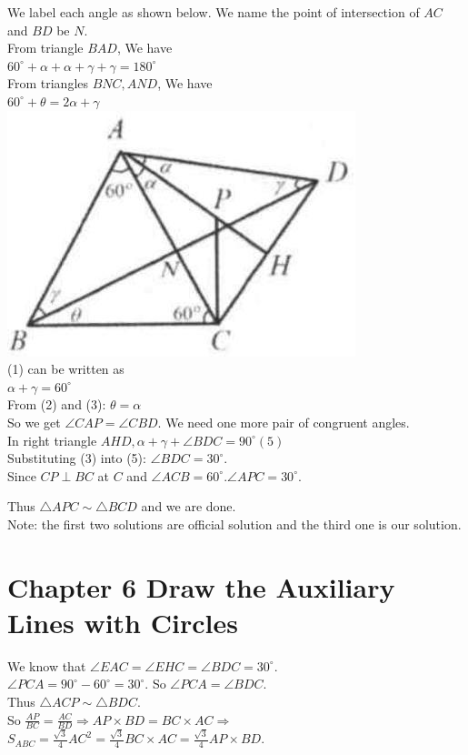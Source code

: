 \documentclass[10pt]{article}
\begin{document}
We label each angle as shown below. We name the point of intersection of \(A C\) and \(B D\) be \(N\).\\
From triangle \(B A D\), We have\\
\(60^{\circ}+\alpha+\alpha+\gamma+\gamma=180^{\circ}\)\\
From triangles \(B N C, A N D\), We have\\
\(60^{\circ}+\theta=2 \alpha+\gamma\)\\
\includegraphics[max width=\textwidth, center]{2025_04_17_97bc1f7e44d93c271a88g-199}\\
(1) can be written as\\
\(\alpha+\gamma=60^{\circ}\)\\
From (2) and (3): \(\theta=\alpha\)\\
So we get \(\angle C A P=\angle C B D\). We need one more pair of congruent angles.\\
In right triangle \(A H D, \alpha+\gamma+\angle B D C=90^{\circ}(5)\)\\
Substituting (3) into (5): \(\angle B D C=30^{\circ}\).\\
Since \(C P \perp B C\) at \(C\) and \(\angle A C B=60^{\circ} . \angle A P C=30^{\circ}\).

Thus \(\triangle A P C \sim \triangle B C D\) and we are done.\\
Note: the first two solutions are official solution and the third one is our solution.

\section*{Chapter 6 Draw the Auxiliary Lines with Circles}
We know that \(\angle E A C=\angle E H C=\angle B D C=30^{\circ}\).\\
\(\angle P C A=90^{\circ}-60^{\circ}=30^{\circ}\). So \(\angle P C A=\angle B D C\).\\
Thus \(\triangle A C P \sim \triangle B D C\).\\
So \(\frac{A P}{B C}=\frac{A C}{B D} \Rightarrow A P \times B D=B C \times A C \Rightarrow\)\\
\(S_{A B C}=\frac{\sqrt{3}}{4} A C^{2}=\frac{\sqrt{3}}{4} B C \times A C=\frac{\sqrt{3}}{4} A P \times B D\).
\end{document}
